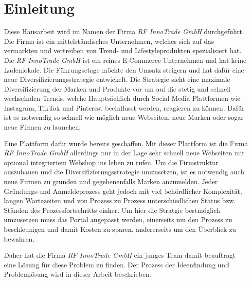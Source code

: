 \newpage

\section{Einleitung} \label{einleitung}
Diese Hausarbeit wird im Namen der Firma \textit{RF InnoTrade GmbH} durchgeführt. Die Firma ist ein mittelständisches Unternehmen, welches sich auf das vermarkten und vertreiben von Trend- und Lifestyleprodukten spezialisiert hat. Die \textit{RF InnoTrade GmbH} ist ein reines E-Commerce Unternehmen und hat keine Ladenlokale. Die Führungsetage möchte den Umsatz steigern und hat dafür eine neue Diversifizierungsstrategie entwickelt. Die Strategie sieht eine maximale Diversifizierung der Marken und Produkte vor um auf die stetig und schnell wechselnden Trends, welche Hauptsächlich durch Social Media Plattformen wie Instagram, TikTok und Pinterest beeinflusst werden, reagieren zu können. Dafür ist es notwendig so schnell wie möglich neue Webseiten, neue Marken oder sogar neue Firmen zu launchen.

Eine Plattform dafür wurde bereits geschaffen. Mit dieser Plattform ist die Firma \textit{RF InnoTrade GmbH} allerdings nur in der Lage sehr schnell neue Webseiten mit optional integriertem Webshop ins leben zu rufen. Um die Firmstruktur auszubauen und die Diversifizierungsstrategie umzusetzen, ist es notwendig auch neue Firmen zu gründen und gegebenenfalls Marken anzumelden. Jeder Gründungs-und Anmeldeprozess geht jedoch mit viel behördlicher Komplexität, langen Wartezeiten und von Prozess zu Prozess unterschiedlichen Status bzw. Ständen des Prozessfortschritts einher. Um hier die Stratgie bestmöglich umzusetzen muss das Portal angepasst werden, einerseits um den Prozess zu beschleunigen und damit Kosten zu sparen, andererseits um den Überblick zu bewahren.

Daher hat die Firma \textit{RF InnoTrade GmbH} ein junges Team damit beauftragt eine Lösung für diese Problem zu finden. Der Prozess der Ideenfindung und Problemlösung wird in dieser Arbeit beschrieben.